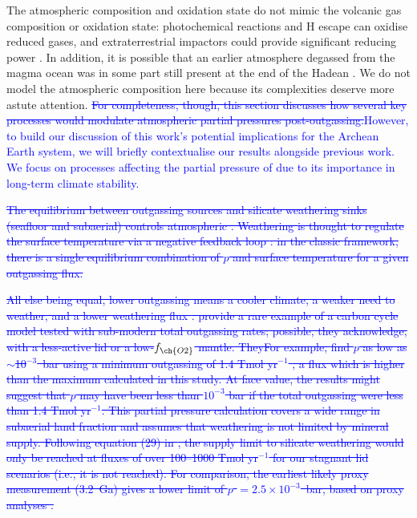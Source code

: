\documentclass[3p,authoryear]{elsarticle}
\newcommand{\editthree}[2]{\textcolor{blue}{\sout{#1}#2}}
\begin{document}
The atmospheric composition and oxidation state do not mimic the volcanic gas composition or  oxidation state: photochemical reactions and H escape can oxidise reduced gases, and extraterrestrial impactors could provide significant reducing power \citep{Zahnle2020}. In addition, it is possible that an earlier atmosphere degassed from the magma ocean was in some part still present at the end of the Hadean \citep{Hamano2013, Nikolaou_2019, Stueken2020}. We do not model the atmospheric composition here because its complexities deserve more astute attention. \editthree{For completeness, though, this section discusses how several key processes would modulate atmospheric partial pressures post-outgassing.}{However, to build our discussion of this work's potential implications for the Archean Earth system, we will briefly contextualise our results alongside previous work. We focus on processes affecting the partial pressure of  due to its importance in long-term climate stability.}


\editthree{The equilibrium between outgassing sources and silicate weathering sinks (seafloor and subaerial) controls atmospheric \ch{CO2}. Weathering is thought to regulate the surface temperature via a negative feedback loop \citep{Walker1981}: in the classic \citep{Walker1981} framework, there is a single equilibrium combination of $p$ and surface temperature for a given outgassing flux.}{}

\editthree{All else being equal, lower outgassing means a cooler climate, a weaker need to weather, and a lower weathering flux\editthree{}{ \citep{Kadoya2014, KT2018}}. \editthree{\citet{KT2018} provide a rare example of a carbon cycle model tested with sub-modern total \ch{CO2} outgassing rates; possible, they acknowledge, with a less-active lid or a low-$f_{\ch{O2}}$ mantle. They}{For example, \citet{KT2018}} find $p$\ch{CO2} as low as $\sim$10$^{-3}$~bar using a minimum outgassing of 1.4 Tmol yr$^{-1}$ \citep{tosi2017habitability}, a flux which is higher than the maximum calculated in this study. At face value, the \citet{KT2018} results might suggest that $p$\ch{CO2} may have been less than $10^{-3}$ bar if the total outgassing were less than 1.4 Tmol yr$^{-1}$. This partial pressure calculation covers a wide range in subaerial land fraction and assumes that weathering is not limited by mineral supply. Following equation (29) in \citet{Foley2018}, the supply limit to silicate weathering would only be reached at \ch{CO2} fluxes of over 100--1000 Tmol yr$^{-1}$ for our stagnant lid scenarios (i.e., it is not reached). For comparison, the earliest likely proxy measurement (3.2~Ga) gives a lower limit of $p$\ch{CO2} $= 2.5 \times 10^{-3}$~bar, based on proxy analyses \citep{Hessler2004}.}{}
\end{document}
